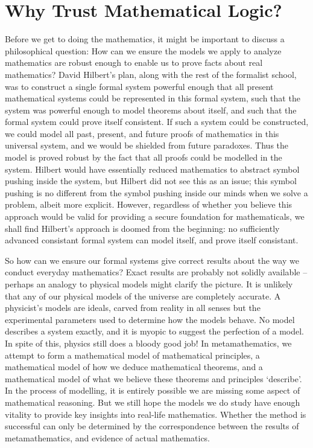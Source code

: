 \section{Why Trust Mathematical Logic?}

Before we get to doing the mathematics, it might be important to discuss a philosophical question: How can we ensure the models we apply to analyze mathematics are robust enough to enable us to prove facts about real mathematics? David Hilbert's plan, along with the rest of the formalist school, was to construct a single formal system powerful enough that all present mathematical systems could be represented in this formal system, such that the system was powerful enough to model theorems about itself, and such that the formal system could prove itself consistent. If such a system could be constructed, we could model all past, present, and future proofs of mathematics in this universal system, and we would be shielded from future paradoxes. Thus the model is proved robust by the fact that all proofs could be modelled in the system. Hilbert would have essentially reduced mathematics to abstract symbol pushing inside the system, but Hilbert did not see this as an issue; this symbol pushing is no different from the symbol pushing inside our minds when we solve a problem, albeit more explicit. However, regardless of whether you believe this approach would be valid for providing a secure foundation for mathematicals, we shall find Hilbert's approach is doomed from the beginning: no sufficiently advanced consistant formal system can model itself, and prove itself consistant.

So how can we ensure our formal systems give correct results about the way we conduct everyday mathematics? Exact results are probably not solidly available -- perhaps an analogy to physical models might clarify the picture. It is unlikely that any of our physical models of the universe are completely accurate. A physicist's models are ideals, carved from reality in all senses but the experimental parameters used to determine how the models behave. No model describes a system exactly, and it is myopic to suggest the perfection of a model. In spite of this, physics still does a bloody good job! In metamathematics, we attempt to form a mathematical model of mathematical principles, a mathematical model of how we deduce mathematical theorems, and a mathematical model of what we believe these theorems and principles `describe'. In the process of modelling, it is entirely possible we are missing some aspect of mathematical reasoning. But we still hope the models we do study have enough vitality to provide key insights into real-life mathematics. Whether the method is successful can only be determined by the correspondence between the results of metamathematics, and evidence of actual mathematics.

